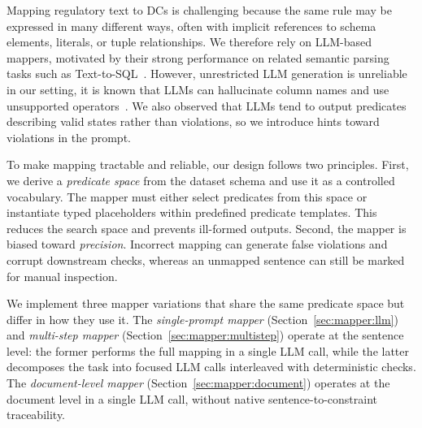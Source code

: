 Mapping regulatory text to DCs is challenging because the same rule may be expressed in many different ways, often with implicit references to schema elements, literals, or tuple relationships. 
We therefore rely on LLM-based mappers, motivated by their strong performance on related semantic parsing tasks such as Text-to-SQL~\cite{llmTEXT2SQLSurvey2025}. However, unrestricted LLM generation is unreliable in our setting, it is known that LLMs  can hallucinate column names and use unsupported operators~\cite{dail2025,llmTEXT2SQLSurvey2025,DBLP:conf/dexa/DociniAO25}. 
We also observed that LLMs tend to output predicates describing valid states rather than violations, so we introduce hints toward violations in the prompt.

To make mapping tractable and reliable, our design follows two principles. First, we derive a \emph{predicate space} from the dataset schema and use it as a controlled vocabulary. The mapper must either select predicates from this space or instantiate typed placeholders within predefined predicate templates. This reduces the search space and prevents ill-formed outputs. Second, the mapper is biased toward \emph{precision}. Incorrect mapping can generate false violations and corrupt downstream checks, whereas an unmapped sentence can still be marked for manual inspection.

We implement three mapper variations that share the same predicate space but differ in how they use it. The \emph{single-prompt mapper} (Section~\ref{sec:mapper:llm}) and \emph{multi-step mapper} (Section~\ref{sec:mapper:multistep}) operate at the sentence level: the former performs the full mapping in a single LLM call, while the latter decomposes the task into focused LLM calls interleaved with deterministic checks. The \emph{document-level mapper} (Section~\ref{sec:mapper:document}) operates at the document level in a single LLM call, without native sentence-to-constraint traceability.



